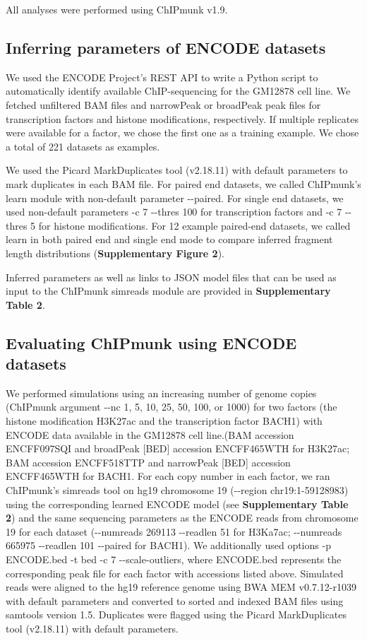 \documentclass[12pt]{article}
\begin{document}
All analyses were performed using ChIPmunk v1.9. %

\subsection*{Inferring parameters of ENCODE datasets}

We used the ENCODE Project's REST API to write a Python script to automatically identify available ChIP-sequencing for the GM12878 cell line.
We fetched unfiltered BAM files and narrowPeak or broadPeak peak files for transcription factors and histone modifications, respectively.
If multiple replicates were available for a factor, we chose the first one as a training example.
We chose a total of 221 datasets as examples.

We used the Picard \cite{picard} MarkDuplicates tool (v2.18.11) with default parameters to mark duplicates in each BAM file.
For paired end datasets, we called ChIPmunk's learn module with non-default parameter -{}-paired.
For single end datasets, we used non-default parameters -c 7 -{}-thres 100 for transcription factors and -c 7 -{}-thres 5 for histone modifications.
For 12 example paired-end datasets, we called learn in both paired end and single end mode to compare inferred fragment length distributions (\textbf{Supplementary Figure 2}).

Inferred parameters as well as links to JSON model files that can be used as input to the ChIPmunk simreads module are provided in \textbf{Supplementary Table 2}.

\subsection*{Evaluating ChIPmunk using ENCODE datasets}

We performed simulations using an increasing number of genome copies (ChIPmunk argument -{}-nc 1, 5, 10, 25, 50, 100, or 1000) for two factors (the histone modification H3K27ac and the transcription factor BACH1) with ENCODE data available in the GM12878 cell line.(BAM accession ENCFF097SQI and broadPeak [BED] accession ENCFF465WTH for H3K27ac; BAM accession ENCFF518TTP and narrowPeak [BED] accession ENCFF465WTH for BACH1.
For each copy number in each factor, we ran ChIPmunk's simreads tool on hg19 chromosome 19 (-{}-region chr19:1-59128983) using the corresponding learned ENCODE model (see \textbf{Supplementary Table 2}) and the same sequencing parameters as the ENCODE reads from chromosome 19 for each dataset (-{}-numreads 269113 -{}-readlen 51 for H3Ka7ac; -{}-numreads 665975 -{}-readlen 101 -{}-paired for BACH1). 
We additionally used options -p ENCODE.bed -t bed -c 7 -{}-scale-outliers, where ENCODE.bed represents the corresponding peak file for each factor with accessions listed above.
Simulated reads were aligned to the hg19 reference genome using BWA MEM \cite{bwamem} v0.7.12-r1039 with default parameters and converted to sorted and indexed BAM files using samtools \cite{samtools} version 1.5. Duplicates were flagged using the Picard \cite{picard} MarkDuplicates tool (v2.18.11) with default parameters.
\end{document}
